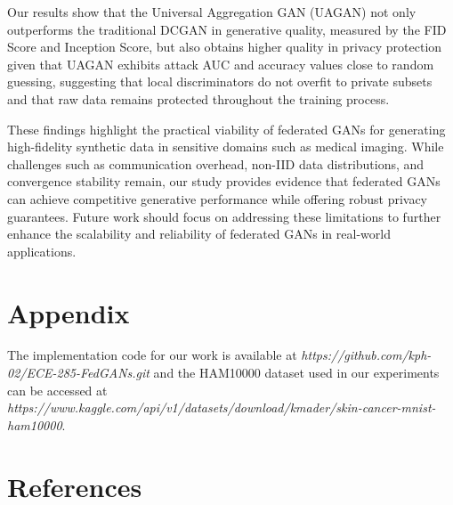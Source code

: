 \documentclass{article}
\begin{document}
Our results show that the Universal Aggregation GAN (UAGAN) not only outperforms the traditional DCGAN in generative quality, measured by the FID Score and Inception Score, but also obtains higher quality in privacy protection given that UAGAN exhibits attack AUC and accuracy values close to random guessing, suggesting that local discriminators do not overfit to private subsets and that raw data remains protected throughout the training process.

These findings highlight the practical viability of federated GANs for generating high-fidelity synthetic data in sensitive domains such as medical imaging. While challenges such as communication overhead, non-IID data distributions, and convergence stability remain, our study provides evidence that federated GANs can achieve competitive generative performance while offering robust privacy guarantees. Future work should focus on addressing these limitations to further enhance the scalability and reliability of federated GANs in real-world applications.

\section{Appendix}
The implementation code for our work is available at {\it https://github.com/kph-02/ECE-285-FedGANs.git} and the HAM10000 dataset used in our experiments can be accessed at {\it https://www.kaggle.com/api/v1/datasets/download/kmader/skin-cancer-mnist-ham10000}.

\section*{References}
\end{document}
